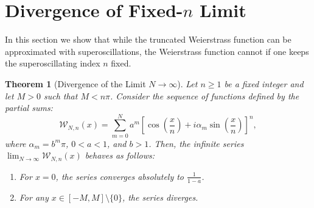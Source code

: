 \documentclass[reqno,11pt]{amsart}
\newtheorem{theorem}{Theorem}[section]
\theoremstyle{definition}
\begin{document}
\section{Divergence of Fixed-$n$ Limit} \label{sec:limits}
In this section we show that while the truncated Weierstrass function can be approximated with superoscillations, the Weierstrass function cannot if one keeps the superoscillating index $n$ fixed.

\begin{theorem}[Divergence of the Limit $N \to \infty$] \label{thm:divergence}
Let $n \geq 1$ be a fixed integer and let $M > 0$ such that $M < n\pi$. Consider the sequence of functions defined by the partial sums:
\begin{equation} \label{eq:super_weierstrass_sum}
    \mathcal{W}_{N, n}(x) = \sum_{m=0}^{N} a^m \left[ \cos\left(\frac{x}{n}\right) + i \alpha_m \sin\left(\frac{x}{n}\right) \right]^n,
\end{equation}
where $\alpha_m = b^m \pi$, $0 < a < 1$, and $b > 1$.
Then, the infinite series $\lim_{N \to \infty} \mathcal{W}_{N, n}(x)$ behaves as follows:
\begin{enumerate}
    \item For $x = 0$, the series converges absolutely to $\frac{1}{1-a}$.
    \item For any $x \in [-M, M] \setminus \{0\}$, the series diverges.
\end{enumerate}
\end{theorem}
\end{document}
